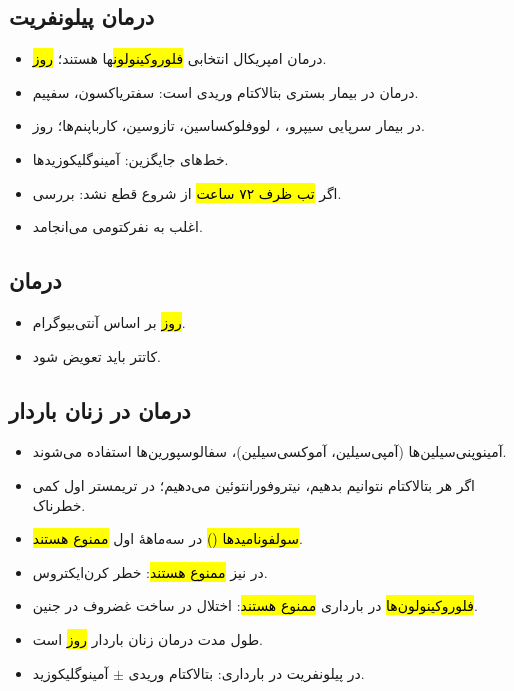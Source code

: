 \subsection*{درمان پیلونفریت}
\begin{itemize}
\item درمان امپریکال انتخابی \hl{فلوروکینولون}ها هستند؛ \hl{ روز}.
\item درمان در بیمار بستری بتالاکتام وریدی است: سفتریاکسون، سفپیم.
\item در بیمار سرپایی سیپرو، ، لووفلوکساسین، تازوسین، کارباپنم‌ها؛  روز.
\item خط‌های جایگزین: آمینوگلیکوزیدها.
\item اگر \hl{تب ظرف ۷۲ ساعت} از شروع  قطع نشد: بررسی.
\item {} اغلب به نفرکتومی می‌انجامد.
\end{itemize}

\subsection*{درمان }
\begin{itemize}
\item \hl{ روز} بر اساس آنتی‌بیوگرام.
\item کاتتر باید تعویض شود.
\end{itemize}

\subsection*{درمان  در زنان باردار}
\begin{itemize}
\item آمینوپنی‌سیلین‌ها (آمپی‌سیلین، آموکسی‌سیلین)، سفالوسپورین‌ها استفاده می‌شوند.
\item اگر هر بتالاکتام نتوانیم بدهیم، نیتروفورانتوئین می‌دهیم؛ در تریمستر اول کمی خطرناک.
\item \hl{سولفونامیدها ()} در سه‌ماههٔ اول \hl{ممنوع هستند}.
\item در  نیز \hl{ممنوع هستند}: خطر کرن‌ایکتروس.
\item \hl{فلوروکینولون‌ها} در بارداری \hl{ممنوع هستند}: اختلال در ساخت غضروف در جنین.
\item طول مدت درمان زنان باردار \hl{ روز} است.
\item در پیلونفریت در بارداری: بتالاکتام وریدی $\pm$ آمینوگلیکوزید.
\end{itemize}

